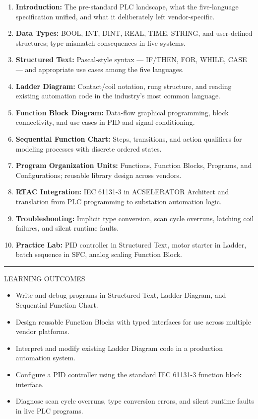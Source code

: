\documentclass[10pt]{article}
\begin{document}
\begin{enumerate}\small
  \item \textbf{Introduction:} The pre-standard PLC landscape, what the five-language specification unified, and what it deliberately left vendor-specific.
  \item \textbf{Data Types:} BOOL, INT, DINT, REAL, TIME, STRING, and user-defined structures; type mismatch consequences in live systems.
  \item \textbf{Structured Text:} Pascal-style syntax — IF/THEN, FOR, WHILE, CASE — and appropriate use cases among the five languages.
  \item \textbf{Ladder Diagram:} Contact/coil notation, rung structure, and reading existing automation code in the industry's most common language.
  \item \textbf{Function Block Diagram:} Data-flow graphical programming, block connectivity, and use cases in PID and signal conditioning.
  \item \textbf{Sequential Function Chart:} Steps, transitions, and action qualifiers for modeling processes with discrete ordered states.
  \item \textbf{Program Organization Units:} Functions, Function Blocks, Programs, and Configurations; reusable library design across vendors.
  \item \textbf{RTAC Integration:} IEC 61131-3 in ACSELERATOR Architect and translation from PLC programming to substation automation logic.
  \item \textbf{Troubleshooting:} Implicit type conversion, scan cycle overruns, latching coil failures, and silent runtime faults.
  \item \textbf{Practice Lab:} PID controller in Structured Text, motor starter in Ladder, batch sequence in SFC, analog scaling Function Block.
\end{enumerate}

\smallskip
{\color{inavy}\rule{\linewidth}{0.4pt}}
\smallskip
{\small\sffamily\color{igray}\MakeUppercase{Learning Outcomes}}
\smallskip

\begin{itemize}\small
  \item Write and debug programs in Structured Text, Ladder Diagram, and Sequential Function Chart.
  \item Design reusable Function Blocks with typed interfaces for use across multiple vendor platforms.
  \item Interpret and modify existing Ladder Diagram code in a production automation system.
  \item Configure a PID controller using the standard IEC 61131-3 function block interface.
  \item Diagnose scan cycle overruns, type conversion errors, and silent runtime faults in live PLC programs.
\end{itemize}
\end{document}
